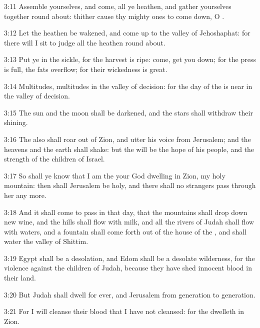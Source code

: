 3:11 Assemble yourselves, and come, all ye heathen, and gather
yourselves together round about: thither cause thy mighty ones to come
down, O \LORD.

3:12 Let the heathen be wakened, and come up to the valley of
Jehoshaphat: for there will I sit to judge all the heathen round
about.

3:13 Put ye in the sickle, for the harvest is ripe: come, get you
down; for the press is full, the fats overflow; for their wickedness
is great.

3:14 Multitudes, multitudes in the valley of decision: for the day of
the \LORD is near in the valley of decision.

3:15 The sun and the moon shall be darkened, and the stars shall
withdraw their shining.

3:16 The \LORD also shall roar out of Zion, and utter his voice from
Jerusalem; and the heavens and the earth shall shake: but the \LORD
will be the hope of his people, and the strength of the children of
Israel.

3:17 So shall ye know that I am the \LORD your God dwelling in Zion, my
holy mountain: then shall Jerusalem be holy, and there shall no
strangers pass through her any more.

3:18 And it shall come to pass in that day, that the mountains shall
drop down new wine, and the hills shall flow with milk, and all the
rivers of Judah shall flow with waters, and a fountain shall come
forth out of the house of the \LORD, and shall water the valley of
Shittim.

3:19 Egypt shall be a desolation, and Edom shall be a desolate
wilderness, for the violence against the children of Judah, because
they have shed innocent blood in their land.

3:20 But Judah shall dwell for ever, and Jerusalem from generation to
generation.

3:21 For I will cleanse their blood that I have not cleansed: for the
\LORD dwelleth in Zion.

